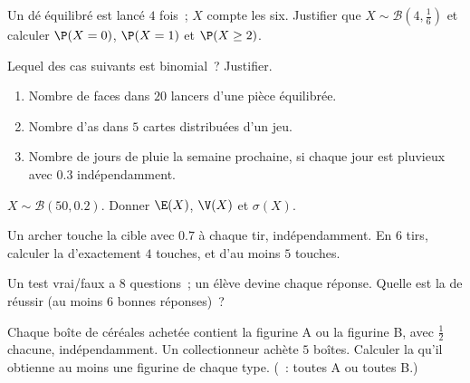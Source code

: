 \begin{exercise}[$\star$]\label{exo:g11:binom:2}
Un dé équilibré est lancé $4$ fois~; $X$ compte les six. Justifier que
$X \sim \mathcal B\left(4, \frac16\right)$ et calculer $\P(X = 0)$,
$\P(X = 1)$ et $\P(X \geq 2)$.
\end{exercise}

\begin{exercise}[$\star$]\label{exo:g11:binom:3}
Lequel des cas suivants est binomial~? Justifier.
\begin{enumerate}
  \item Nombre de faces dans $20$ lancers d'une pièce équilibrée.
  \item Nombre d'as dans $5$ cartes distribuées d'un jeu.
  \item Nombre de jours de pluie la semaine prochaine, si chaque jour est
        pluvieux avec  $0.3$ indépendamment.
\end{enumerate}
\end{exercise}

\begin{exercise}[$\star$]\label{exo:g11:binom:4}
$X \sim \mathcal B(50, 0.2)$. Donner $\E(X)$, $\V(X)$ et $\sigma(X)$.
\end{exercise}

\begin{exercise}[$\star\star$]\label{exo:g11:binom:5}
Un archer touche la cible avec  $0.7$ à chaque tir,
indépendamment. En $6$ tirs, calculer la  d'exactement $4$
touches, et d'au moins $5$ touches.
\end{exercise}

\begin{exercise}[$\star\star$]\label{exo:g11:binom:6}
Un test vrai/faux a $8$ questions~; un élève devine chaque réponse.
Quelle est la  de réussir (au moins $6$ bonnes réponses)~?
\end{exercise}

\begin{exercise}[$\star\star$]\label{exo:g11:binom:7}
Chaque boîte de céréales achetée contient la figurine A ou la figurine B,
avec  $\frac12$ chacune, indépendamment. Un collectionneur
achète $5$ boîtes. Calculer la  qu'il obtienne au moins une
figurine de chaque type. (~: toutes A ou toutes B.)
\end{exercise}

